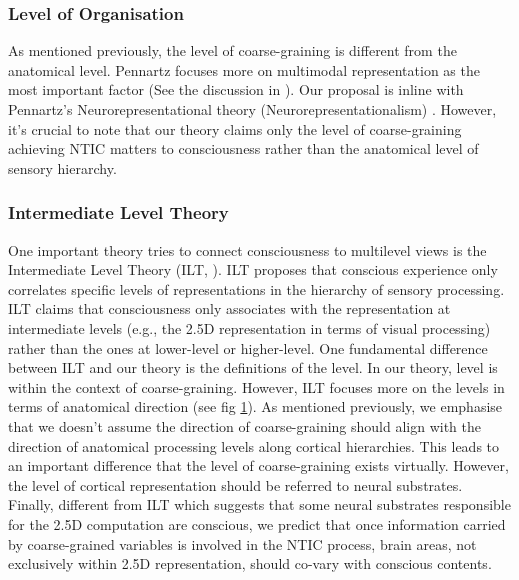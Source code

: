 \documentclass[utf8]{article}
\begin{document}
        
		\begin{figure}[H]
		
			\label{fig:hierarchy}
		\end{figure}
    


                \subsubsection*{Level of Organisation \cite{wimsatt1994ontology}}
                    As mentioned previously, the level of coarse-graining is different from the anatomical level.
                    Pennartz focuses more on multimodal representation as the most important factor (See the discussion in \cite{pennartz2015brain}). Our proposal is inline with Pennartz's Neurorepresentational  theory (Neurorepresentationalism) \cite{pennartz2018consciousness,pennartz2015brain}. However, it’s crucial to note that our theory claims only the level of coarse-graining achieving NTIC matters to consciousness rather than the anatomical level of sensory hierarchy. 
    
    			\subsubsection*{Intermediate Level Theory} \label{IntermediateLevelTheory}
                    One important theory tries to connect consciousness to multilevel views is the Intermediate Level Theory (ILT, \cite{jackendoff1987consciousness, prinz2007intermediate}). ILT proposes that conscious experience only correlates specific levels of representations in the hierarchy of sensory processing. ILT claims that consciousness only associates with the representation at intermediate levels (e.g., the 2.5D representation in terms of visual processing) rather than the ones at lower-level or higher-level. 
                    One fundamental difference between ILT and our theory is the definitions of the level. In our theory, level is within the context of coarse-graining. However, ILT focuses more on the levels in terms of anatomical direction (see fig \ref{fig:hierarchy}). As mentioned previously, we emphasise that we doesn't assume the direction of coarse-graining should align with the direction of anatomical processing levels along cortical hierarchies. This leads to an important difference that the level of coarse-graining exists virtually. However, the level of cortical representation should be referred to neural substrates. Finally, different from ILT which suggests that some neural substrates responsible for the 2.5D computation are conscious, we predict that once information carried by coarse-grained variables is involved in the NTIC process, brain areas, not exclusively within 2.5D representation, should  co-vary with conscious contents. 
    				
\end{document}
